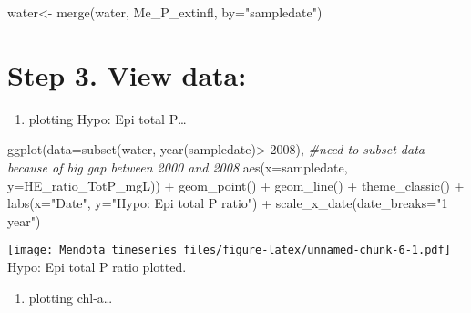 \documentclass[
]{article}
\newenvironment{Shaded}{\begin{snugshade}}{\end{snugshade}}
\newcommand{\AttributeTok}[1]{\textcolor[rgb]{0.77,0.63,0.00}{#1}}
\newcommand{\CommentTok}[1]{\textcolor[rgb]{0.56,0.35,0.01}{\textit{#1}}}
\newcommand{\DecValTok}[1]{\textcolor[rgb]{0.00,0.00,0.81}{#1}}
\newcommand{\FunctionTok}[1]{\textcolor[rgb]{0.00,0.00,0.00}{#1}}
\newcommand{\NormalTok}[1]{#1}
\newcommand{\OtherTok}[1]{\textcolor[rgb]{0.56,0.35,0.01}{#1}}
\newcommand{\SpecialCharTok}[1]{\textcolor[rgb]{0.00,0.00,0.00}{#1}}
\newcommand{\StringTok}[1]{\textcolor[rgb]{0.31,0.60,0.02}{#1}}
\providecommand{\tightlist}{%
  \setlength{\itemsep}{0pt}\setlength{\parskip}{0pt}}
\begin{document}
\begin{Shaded}
\begin{Highlighting}[]
\NormalTok{water}\OtherTok{\textless{}{-}} \FunctionTok{merge}\NormalTok{(water, Me\_P\_extinfl, }\AttributeTok{by=}\StringTok{"sampledate"}\NormalTok{)}
\end{Highlighting}
\end{Shaded}

\hypertarget{step-3.-view-data}{%
\section{Step 3. View data:}\label{step-3.-view-data}}

\begin{enumerate}
\def\labelenumi{\alph{enumi})}
\tightlist
\item
  plotting Hypo: Epi total P\ldots{}
\end{enumerate}

\begin{Shaded}
\begin{Highlighting}[]
\FunctionTok{ggplot}\NormalTok{(}\AttributeTok{data=}\FunctionTok{subset}\NormalTok{(water, }\FunctionTok{year}\NormalTok{(sampledate)}\SpecialCharTok{\textgreater{}} \DecValTok{2008}\NormalTok{), }\CommentTok{\#need to subset data because of big gap between 2000 and 2008}
       \FunctionTok{aes}\NormalTok{(}\AttributeTok{x=}\NormalTok{sampledate, }\AttributeTok{y=}\NormalTok{HE\_ratio\_TotP\_mgL)) }\SpecialCharTok{+}
  \FunctionTok{geom\_point}\NormalTok{() }\SpecialCharTok{+}
  \FunctionTok{geom\_line}\NormalTok{() }\SpecialCharTok{+} 
  \FunctionTok{theme\_classic}\NormalTok{() }\SpecialCharTok{+}
  \FunctionTok{labs}\NormalTok{(}\AttributeTok{x=}\StringTok{"Date"}\NormalTok{, }\AttributeTok{y=}\StringTok{"Hypo: Epi total P ratio"}\NormalTok{) }\SpecialCharTok{+}
  \FunctionTok{scale\_x\_date}\NormalTok{(}\AttributeTok{date\_breaks=}\StringTok{"1 year"}\NormalTok{) }
\end{Highlighting}
\end{Shaded}

\texttt{[image: Mendota\_timeseries\_files/figure-latex/unnamed-chunk-6-1.pdf]}
Hypo: Epi total P ratio plotted.

\begin{enumerate}
\def\labelenumi{\alph{enumi})}
\setcounter{enumi}{1}
\tightlist
\item
  plotting chl-a\ldots{}
\end{enumerate}
\end{document}
